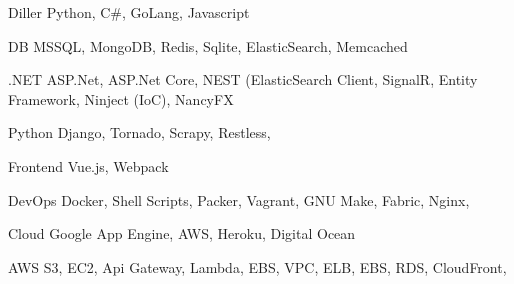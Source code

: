 

\begin{cvskills}



  \cvskill
    {Diller} %
    {Python, C\#, GoLang, Javascript} %

  
  \cvskill
    {DB}
    {MSSQL, MongoDB, Redis, Sqlite, ElasticSearch, Memcached}
    
  \cvskill
    {.NET}
    {ASP.Net, ASP.Net Core, NEST (ElasticSearch Client, SignalR, Entity Framework, Ninject (IoC), NancyFX}

  \cvskill
    {Python}
    {Django, Tornado, Scrapy, Restless, }

  \cvskill
    {Frontend}
    {Vue.js, Webpack}

  \cvskill
    {DevOps}
    {Docker, Shell Scripts, Packer, Vagrant, GNU Make, Fabric, Nginx, }

  \cvskill
    {Cloud}
    {Google App Engine, AWS, Heroku, Digital Ocean}
  
  \cvskill
    {AWS}
    {S3, EC2, Api Gateway, Lambda, EBS, VPC, ELB, EBS, RDS, CloudFront, }
         
\end{cvskills}



